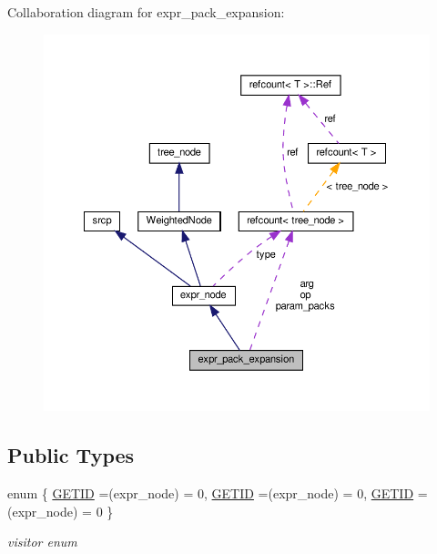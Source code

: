 Collaboration diagram for expr\+\_\+pack\+\_\+expansion\+:
\nopagebreak
\begin{figure}[H]
\begin{center}
\leavevmode
\includegraphics[width=350pt]{d2/d26/structexpr__pack__expansion__coll__graph}
\end{center}
\end{figure}
\subsection*{Public Types}
\begin{DoxyCompactItemize}
\item 
enum \{ \hyperlink{structexpr__pack__expansion_ad1bd43f8d3ce5c891879040cd92fd4eea185de3f757e23cc5d4910d6637a21613}{G\+E\+T\+ID} =(expr\+\_\+node) = 0, 
\hyperlink{structexpr__pack__expansion_ad1bd43f8d3ce5c891879040cd92fd4eea185de3f757e23cc5d4910d6637a21613}{G\+E\+T\+ID} =(expr\+\_\+node) = 0, 
\hyperlink{structexpr__pack__expansion_ad1bd43f8d3ce5c891879040cd92fd4eea185de3f757e23cc5d4910d6637a21613}{G\+E\+T\+ID} =(expr\+\_\+node) = 0
 \}\begin{DoxyCompactList}\small\item\em visitor enum \end{DoxyCompactList}
\end{DoxyCompactItemize}
